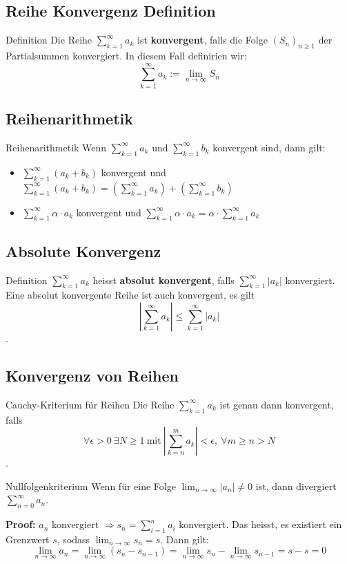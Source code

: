 \documentclass[a4paper,8pt]{extarticle}
\def\limn{\lim_{n\to \infty}}
\def\sumk{\sum_{k=1}^\infty}
\def\sumn{\sum_{n=0}^\infty}
\begin{document}
\subsection{Reihe Konvergenz Definition}
\begin{mainbox}{Definition}
  Die Reihe $\sum_{k=1}^\infty a_k$ ist \textbf{konvergent}, falls die Folge $(S_n)_{n \geq 1}$ der Partialsummen konvergiert. In diesem Fall definirien wir: $$\sum_{k=1}^\infty a_k := \lim_{n\to \infty} S_n$$
\end{mainbox}

\subsection{Reihenarithmetik}
\begin{subbox}{Reihenarithmetik}
Wenn $\sumk a_k$ und $\sumk b_k$ konvergent sind, dann gilt:
\begin{itemize}
 \item $\sumk (a_k + b_k)$ konvergent und $\sumk (a_k + b_k) = \left( \sumk a_k \right) + \left( \sumk b_k \right)$
 \item $\sumk \alpha \cdot a_k$ konvergent und $\sumk \alpha \cdot a_k = \alpha \cdot \sumk a_k$
\end{itemize}
\end{subbox}

\subsection{Absolute Konvergenz}
\begin{subbox}{Definition}
$\sumk a_k$ heisst \textbf{absolut konvergent}, falls $\sumk |a_k|$ konvergiert. Eine absolut konvergente Reihe ist auch konvergent, es gilt $$|\sumk a_k| \le \sumk |a_k|$$.
\end{subbox}


\subsection{Konvergenz von Reihen}

\begin{mainbox}{Cauchy-Kriterium für Reihen}
Die Reihe $\sumk a_k$ ist genau dann konvergent, falls $$\forall \epsilon > 0 \ \exists N \ge 1 \ \text{mit} \ | \sum_{k=n}^m a_k | < \epsilon, \ \forall m \ge n > N$$.
\end{mainbox}

\begin{mainbox}{Nullfolgenkriterium}
 Wenn für eine Folge $\limn |a_n| \ne 0$ ist, dann divergiert $\sumn a_n$.
\end{mainbox}
\noindent\textbf{Proof:} 
$a_n$ konvergiert $\Rightarrow s_n = \sum_{i = 1}^n a_i$ konvergiert. Das heisst, es existiert ein Grenzwert $s$, sodass $\lim_{n \to \infty} s_n = s$. Dann gilt:
$$\lim_{n \to \infty} a_n = \lim_{n \to \infty} (s_n - s_{n-1}) = \lim_{n \to \infty} s_n - \lim_{n \to \infty} s_{n-1} = s - s = 0$$
\end{document}
